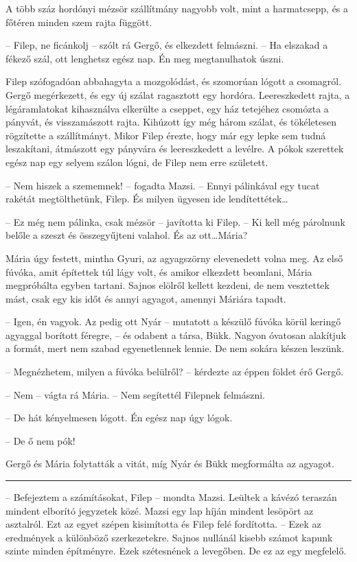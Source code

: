 \documentclass[10pt]{memoir}
\renewcommand{\pfbreakdisplay}{\bigskip \ding{166} \bigskip}
\newcommand{\secbreak}{\fancybreak{\pfbreakdisplay}\indent}
\begin{document}
A több száz hordónyi mézsör szállítmány nagyobb volt, mint a harmatcsepp, és a
főtéren minden szem rajta függött.

-- Filep, ne ficánkolj -- szólt rá Gergő, és elkezdett felmászni. -- Ha
elszakad a fékező szál, ott lenghetsz egész nap. Én meg megtanulhatok úszni.

Filep szófogadóan abbahagyta a mozgolódást, és szomorúan lógott a csomagról.
Gergő megérkezett, és egy új szálat ragasztott egy hordóra. Leereszkedett
rajta, a légáramlatokat kihasználva elkerülte a cseppet, egy ház tetejéhez
csomózta a pányvát, és visszamászott rajta. Kihúzott így még három szálat, és
tökéletesen rögzítette a szállítmányt. Mikor Filep érezte, hogy már egy lepke
sem tudná leszakítani, átmászott egy pányvára és leereszkedett a levélre. A
pókok szerettek egész nap egy selyem szálon lógni, de Filep nem erre született.

-- Nem hiszek a szememnek! -- fogadta Mazsi. -- Ennyi pálinkával egy tucat
rakétát megtölthetünk, Filep. És milyen ügyesen ide lendítettétek\dots

-- Ez még nem pálinka, csak mézsör -- javította ki Filep. -- Ki kell még
párolnunk belőle a szeszt és összegyűjteni valahol. És az ott\dots Mária?

Mária úgy festett, mintha Gyuri, az agyagszörny elevenedett volna meg. Az első
fúvóka, amit építettek túl lágy volt, és amikor elkezdett beomlani, Mária
megpróbálta egyben tartani. Sajnos elölről kellett kezdeni, de nem vesztettek
mást, csak egy kis időt és annyi agyagot, amennyi Máriára tapadt.

-- Igen, én vagyok. Az pedig ott Nyár -- mutatott a készülő fúvóka körül
keringő agyaggal borított féregre, -- és odabent a társa, Bükk. Nagyon
óvatosan alakítjuk a formát, mert nem szabad egyenetlennek lennie. De nem
sokára készen leszünk.

-- Megnézhetem, milyen a fúvóka belülről? -- kérdezte az éppen földet érő
Gergő.

-- Nem -- vágta rá Mária. -- Nem segítettél Filepnek felmászni.

-- De hát kényelmesen lógott. Én egész nap úgy lógok.

-- De ő nem pók!

Gergő és Mária folytatták a vitát, míg Nyár és Bükk megformálta az agyagot.

\secbreak

-- Befejeztem a számításokat, Filep -- mondta Mazsi. Leültek a kávézó
teraszán mindent elborító jegyzetek közé. Mazsi egy lap híján mindent lesöpört
az asztalról. Ezt az egyet szépen kisimította és Filep felé fordította. --
Ezek az eredmények a különböző szerkezetekre. Sajnos nullánál kisebb számot
kapunk szinte minden építményre. Ezek szétesnének a levegőben. De ez az egy
megfelelő.
\end{document}
